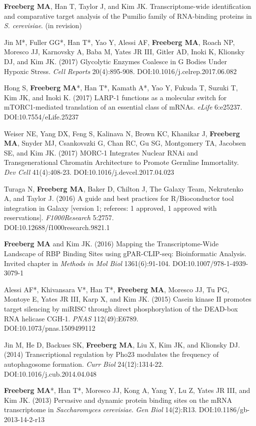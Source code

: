 \documentclass[margin,line]{res}
\begin{document}
\begin{resume}
{\bf Freeberg MA}, Han T, Taylor J, and Kim JK. Transcriptome-wide identification and comparative target analysis of the Pumilio family of RNA-binding proteins in {\em S. cerevisiae}. (in revision)

Jin M*, Fuller GG*, Han T*, Yao Y, Alessi AF, {\bf Freeberg MA}, Roach NP, Moresco JJ, Karnovsky A, Baba M, Yates JR III, Gitler AD, Inoki K, Klionsky DJ, and Kim JK. (2017) Glycolytic Enzymes Coalesce in G Bodies Under Hypoxic Stress. {\em Cell Reports} 20(4):895-908. DOI:10.1016/j.celrep.2017.06.082

Hong S, {\bf Freeberg MA}*, Han T*, Kamath A*, Yao Y, Fukuda T, Suzuki T, Kim JK, and Inoki K. (2017) LARP-1 functions as a molecular switch for mTORC1-mediated translation of an essential class of mRNAs. {\em eLife} 6:e25237. DOI:10.7554/eLife.25237

Weiser NE, Yang DX, Feng S, Kalinava N, Brown KC, Khanikar J, {\bf Freeberg MA}, Snyder MJ, Csankovszki G, Chan RC,  Gu SG, Montgomery TA, Jacobsen SE, and Kim JK. (2017) MORC-1 Integrates Nuclear RNAi and Transgenerational Chromatin Architecture to Promote Germline Immortality. {\em Dev Cell} 41(4):408-23. DOI:10.1016/j.devcel.2017.04.023

Turaga N, {\bf Freeberg MA}, Baker D, Chilton J, The Galaxy Team, Nekrutenko A, and Taylor J. (2016) A guide and best practices for R/Bioconductor tool integration in Galaxy [version 1; referees: 1 approved, 1 approved with reservations]. {\em F1000Research} 5:2757. \\DOI:10.12688/f1000research.9821.1

{\bf Freeberg MA} and Kim JK. (2016) Mapping the Transcriptome-Wide Landscape of RBP Binding Sites using gPAR-CLIP-seq: Bioinformatic Analysis. Invited chapter in {\em Methods in Mol Biol} 1361(6):91-104. DOI:10.1007/978-1-4939-3079-1

Alessi AF*, Khivansara V*, Han T*, {\bf Freeberg MA}, Moresco JJ, Tu PG, Montoye E, Yates JR III, Karp X, and Kim JK. (2015) Casein kinase II promotes target silencing by miRISC through direct phosphorylation of the DEAD-box RNA helicase CGH-1. {\em PNAS} 112(49):E6789. \\DOI:10.1073/pnas.1509499112

Jin M, He D, Backues SK, {\bf Freeberg MA}, Liu X, Kim JK, and Klionsky DJ. (2014) Transcriptional regulation by Pho23 modulates the frequency of autophagosome formation. {\em Curr Biol} 24(12):1314-22. DOI:10.1016/j.cub.2014.04.048

{\bf Freeberg MA}*, Han T*, Moresco JJ, Kong A, Yang Y, Lu Z, Yates JR III, and Kim JK. (2013) Pervasive and dynamic protein binding sites on the mRNA transcriptome in {\em Saccharomyces cerevisiae}. {\em Gen Biol} 14(2):R13. DOI:10.1186/gb-2013-14-2-r13


\end{resume}
\end{document}
